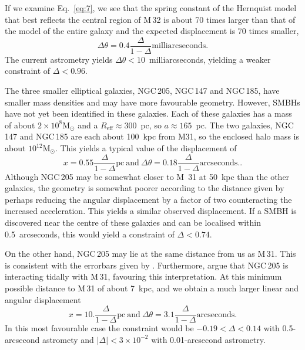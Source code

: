 \documentclass[useAMS,usenatbib]{mn2e}
\newcommand{\msun}{\mathrm{M}_\odot}
\begin{document}
If we examine Eq.~\ref{eq:7}, we see that the spring constant of the
Hernquist model that best reflects the central region of M\,32 is
about 70 times larger than that of the model of the entire galaxy and
the expected displacement is 70 times smaller,
\begin{equation}
  \Delta \theta = 0.4 \frac{\Delta}{1-\Delta} \textrm{milliarcseconds}.
\end{equation}
The current astrometry yields $\Delta \theta<10$~milliarcseconds,
yielding a weaker constraint of $\Delta<0.96$.  

The three smaller elliptical galaxies, NGC\,205, NGC\,147 and NGC\,185,
have smaller mass densities and may have more favourable geometry.  However,
SMBHs have not yet been identified in these galaxies.  Each of these
galaxies has a mass of about $2 \times 10^8 \msun$ and a
$R_\mathrm{eff} \approx 300$~pc, so $a \approx 165$~pc.  The two
galaxies, NGC\,147 and NGC\,185 are each about 100~kpc from M31, so the
enclosed halo mass is about $10^{12} \msun$.  This yields a
typical value of the displacement of
\begin{equation}
  x = 0.55 \frac{\Delta}{1-\Delta} \mathrm{pc} ~\mathrm{and}~
  \Delta \theta = 0.18 \frac{\Delta}{1-\Delta} \mathrm{arcseconds}.
  \label{eq:12}.
\end{equation}
Although NGC\,205 may be somewhat closer to M~31 at 50~kpc than the
other galaxies, the geometry is somewhat poorer according to the
distance given by \citet{2006AJ....131.1405K} perhaps reducing the
angular displacement by a factor of two counteracting the increased
acceleration.  This yields a similar observed displacement.  If a SMBH
is discovered near the centre of these galaxies and can be localised
within 0.5~arcseconds, this would yield a constraint of $\Delta<0.74$.

On the other hand, NGC\,205 may lie at the same distance from
us as M\,31. This is consistent with the errorbars given by
\citet{2006AJ....131.1405K}.  Furthermore, \citet{2006AJ....131..332G}
argue that NGC\,205 is interacting tidally with M\,31, favouring this
interpretation.  At this minimum possible distance to M\,31 of about
7~kpc, and we obtain a much larger linear and angular displacement
\begin{equation}
  x = 10. \frac{\Delta}{1-\Delta} \mathrm{pc} ~\mathrm{and}~
  \Delta \theta = 3.1 \frac{\Delta}{1-\Delta} \mathrm{arcseconds}.
\end{equation}
In this most favourable case the constraint would be $-0.19 < \Delta < 0.14$
with 0.5-arcsecond astromety and $|\Delta|<3\times 10^{-2}$ with
0.01-arcsecond astrometry.
\end{document}
